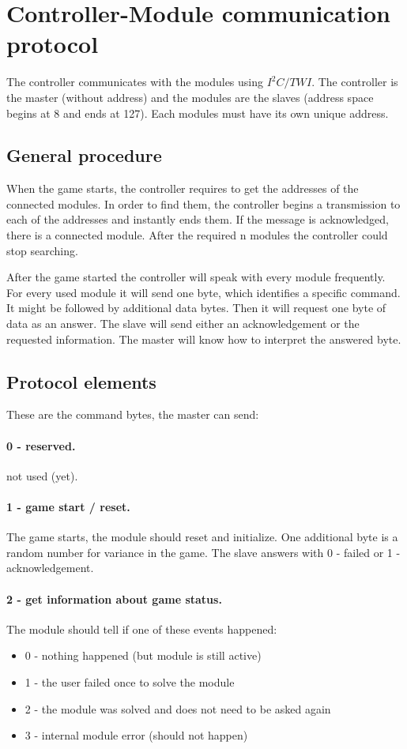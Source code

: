 \documentclass[a4paper, 12pt]{article}
\begin{document}
\section*{Controller-Module communication protocol}

The controller communicates with the modules using $I^2C/TWI$. The controller is the master (without address) and the modules are the slaves (address space begins at 8 and ends at 127). Each modules must have its own unique address.

\subsection*{General procedure}

When the game starts, the controller requires to get the addresses of the connected modules. In order to find them, the controller begins a transmission to each of the addresses and instantly ends them. If the message is acknowledged, there is a connected module. After the required n modules the controller could stop searching.

After the game started the controller will speak with every module frequently. For every used module it will send one byte, which identifies a specific command. It might be followed by additional data bytes. Then it will request one byte of data as an answer. The slave will send either an acknowledgement or the requested information. The master will know how to interpret the answered byte.

\subsection*{Protocol elements}

These are the command bytes, the master can send:

\paragraph*{0 - reserved.}
not used (yet).

\paragraph*{1 - game start / reset.}
The game starts, the module should reset and initialize. One additional byte is a random number for variance in the game. The slave answers with 0 - failed or 1 - acknowledgement.

\paragraph*{2 - get information about game status.}
The module should tell if one of these events happened:
\begin{itemize}
\setlength{\itemsep}{0pt}
\item 0 - nothing happened (but module is still active)
\item 1 - the user failed once to solve the module
\item 2 - the module was solved and does not need to be asked again
\item 3 - internal module error (should not happen)
\end{itemize}
\end{document}
